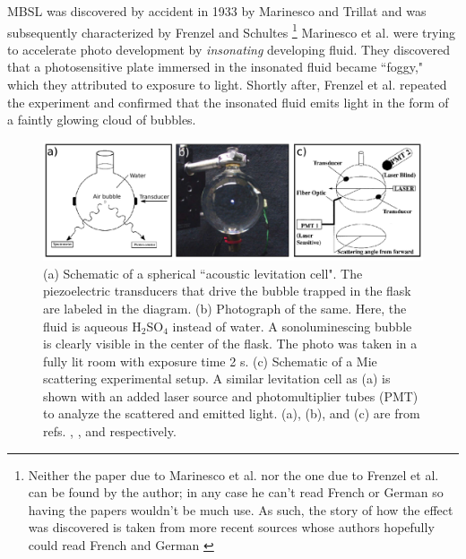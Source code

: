 \documentclass[prb,aps,nofootinbib,superscriptaddress,floatfix]{revtex4-2}
\begin{document}
MBSL was discovered by accident in 1933 by Marinesco and Trillat \cite{marinesco1933actions} and was subsequently characterized by Frenzel and Schultes \cite{frenzel1934luminescenz} \footnote{Neither the paper due to Marinesco et al. nor the one due to Frenzel et al. can be found by the author; in any case he can't read French or German so having the papers wouldn't be much use. As such, the story of how the effect was discovered is taken from more recent sources whose authors hopefully could read French and German \cite{brenner2002single,gaitan1990experimental,crum1994sonoluminescence}} Marinesco et al. were trying to accelerate photo development by \emph{insonating} developing fluid. They discovered that a photosensitive plate immersed in the insonated fluid became ``foggy," which they attributed to exposure to light. Shortly after, Frenzel et al. repeated the experiment and confirmed that the insonated fluid emits light in the form of a faintly glowing cloud of bubbles. 

\begin{figure}
\includegraphics[width=0.95\linewidth]{figs/flask.pdf}
    \caption{(a) Schematic of a spherical ``acoustic levitation cell". The piezoelectric transducers that drive the bubble trapped in the flask are labeled in the diagram. (b) Photograph of the same. Here, the fluid is aqueous H$_2$SO$_4$ instead of water. A sonoluminescing bubble is clearly visible in the center of the flask. The photo was taken in a fully lit room with exposure time 2 s. (c) Schematic of a Mie scattering experimental setup. A similar levitation cell as (a) is shown with an added laser source and photomultiplier tubes (PMT) to analyze the scattered and emitted light. (a), (b), and (c) are from refs. \cite{brenner2002single}, \cite{suslick2008inside}, and \cite{gompf2000mie} respectively.}
\label{fig:flask}
\end{figure}
\end{document}

